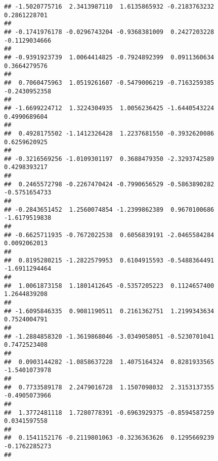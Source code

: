 \documentclass[]{article}
\begin{document}
\begin{verbatim}
## -1.5020775716  2.3413987110  1.6135865932 -0.2183763232  0.2861228701 
##                                                                       
## -0.1741976178 -0.0296743204 -0.9368381009  0.2427203228 -0.1129034666 
##                                                                       
## -0.9391923739  1.0064414825 -0.7924892399  0.0911360634  0.3664279576 
##                                                                       
##  0.7060475963  1.0519261607 -0.5479006219 -0.7163259385 -0.2430952358 
##                                                                       
## -1.6699224712  1.3224304935  1.0056236425 -1.6440543224  0.4990689604 
##                                                                       
##  0.4928175502 -1.1412326428  1.2237681550 -0.3932620086  0.6259620925 
##                                                                       
## -0.3216569256 -1.0109301197  0.3688479350 -2.3293742589  0.4298393217 
##                                                                       
##  0.2465572798 -0.2267470424 -0.7990656529 -0.5863890282 -0.5751654733 
##                                                                       
## -0.2843651452  1.2560074854 -1.2399862389  0.9670100686 -1.6179519838 
##                                                                       
## -0.6625711935 -0.7672022538  0.6056839191 -2.0465584284  0.0092062013 
##                                                                       
##  0.8195280215 -1.2822579953  0.6104915593 -0.5488364491 -1.6911294464 
##                                                                       
##  1.0061873158  1.1801412645 -0.5357205223  0.1124657400  1.2644839208 
##                                                                       
## -1.6095846335  0.9081190511  0.2161362751  1.2199343634  0.7524004791 
##                                                                       
## -1.2884858320 -1.3619868046 -3.0349058051 -0.5230701041  0.7472523408 
##                                                                       
##  0.0903144282 -1.0858637228  1.4075164324  0.8281933565 -1.5401073978 
##                                                                       
##  0.7733589178  2.2479016728  1.1507098032  2.3153137355 -0.4905073966 
##                                                                       
##  1.3772481118  1.7280778391 -0.6963929375 -0.8594587259  0.0341597558 
##                                                                       
##  0.1541152176 -0.2119801063 -0.3236363626  0.1295669239 -0.1762285273 
##                                                                       

\end{verbatim}
\end{document}
